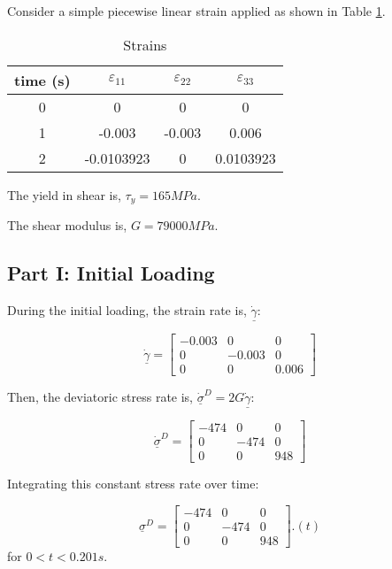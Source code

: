 \documentclass[10pt,letterpaper]{article}
\begin{document}
Consider a simple piecewise linear strain applied as shown in Table \ref{tab:Strains}.

\begin{table}[h]
\noindent \begin{centering}
\begin{tabular}{|c|c|c|c|}
\hline
time (s) & $\varepsilon_{11}$ & $\varepsilon_{22}$ & $\varepsilon_{33}$\tabularnewline
\hline
\hline
0 & 0 & 0 & 0\tabularnewline
\hline
1 & -0.003 & -0.003 & 0.006\tabularnewline
\hline
2 & -0.0103923 & 0 & 0.0103923\tabularnewline
\hline
\end{tabular}
\par\end{centering}

\caption{Strains\label{tab:Strains}}
\end{table}


The yield in shear is, $\tau_{y}=165MPa$.

The shear modulus is, $G=79000MPa$.


\subsection{Part I: Initial Loading}

During the initial loading, the strain rate is, $\dot{\underline{\gamma}}$:

\[
\dot{\underline{\gamma}}=\left[\begin{array}{ccc}
-0.003 & 0 & 0\\
0 & -0.003 & 0\\
0 & 0 & 0.006
\end{array}\right]
\]


Then, the deviatoric stress rate is, $\dot{\underline{\sigma}}^{D}=2G\dot{\underline{\gamma}}$:

\[
\dot{\underline{\sigma}}^{D}=\left[\begin{array}{ccc}
-474 & 0 & 0\\
0 & -474 & 0\\
0 & 0 & 948
\end{array}\right]
\]


Integrating this constant stress rate over time:

\[
\underline{\sigma}^{D}=\left[\begin{array}{ccc}
-474 & 0 & 0\\
0 & -474 & 0\\
0 & 0 & 948
\end{array}\right].\left(t\right)
\]
for $0<t<0.201s$.
\end{document}

